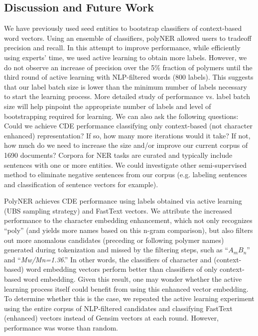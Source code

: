 \subsection{Discussion and Future Work}
\label{sec:discussion}
We have previously used seed entities to bootstrap classifiers of context-based word vectors. 
Using an ensemble of classifiers, polyNER allowed users to tradeoff precision and recall.
In this attempt to improve performance, while efficiently using experts' time, we used active learning to obtain more labels. %
However, we do not observe an increase of precision over the 5\% fraction of polymers until the third round of active learning with NLP-filtered words (800 labels). 
This suggests that our label batch size is lower than the minimum number of labels necessary to start the learning process.
More detailed study of performance vs. label batch size will help pinpoint the appropriate number of labels and level of bootstrapping required for learning.
We can also ask the following questions: Could we achieve CDE performance classifying only context-based (not character enhanced) representation? If so, how many more iterations would it take? If not, how much do we need to increase the size and/or improve our current corpus of \num{1690} documents?
Corpora for NER tasks are curated and typically include sentences with one or more entities.
We could investigate other semi-supervised method to eliminate negative sentences from our corpus (e.g. labeling sentences and classification of sentence vectors for example).

PolyNER achieves CDE performance using labels obtained via active learning (UBS sampling strategy) and FastText vectors.
We attribute the increased performance to the character embedding enhancement, which not only recognizes ``poly'' (and yields more names based on this n-gram comparison), 
but also filters out more anomalous candidates (preceding or following polymer names) generated during tokenization and missed by the filtering steps, 
such as ``\textit{$A_mB_n$}'' and ``\textit{Mw/Mn=1.36}.'' 
In other words, the classifiers of character and (context-based) word embedding vectors perform better than classifiers of only context-based word embedding.
Given this result, one may wonder whether the active learning process itself could benefit from using this enhanced vector embedding. 
To determine whether this is the case,
we repeated the active learning experiment using the entire corpus of NLP-filtered candidates and classifying FastText (enhanced) vectors instead of Gensim vectors at each round. 
However, performance was worse than random.

